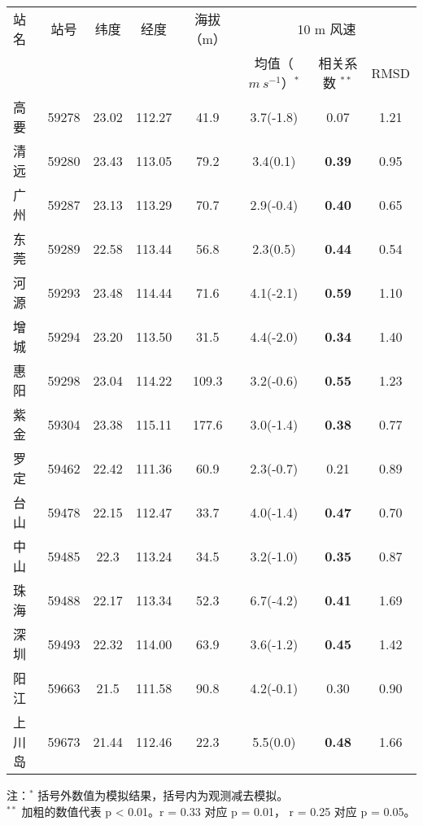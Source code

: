 \begin{table}[!htbp]
    \label{tab:PRDsiteinfo}
    \centering
    \small%
    \setlength{\tabcolsep}{5 pt}%
    \renewcommand{\arraystretch}{1.0}%
    \begin{tabular}{lccccccc}
        \hline
        站名 & 站号 & 纬度 & 经度 & 海拔（m）&  \multicolumn{3}{c}{10 m 风速} \\
         & & & & & 均值（$m ~ s^{-1}$）$^*$ &  相关系数 $^ {**}$ & RMSD \\
        \hline
        高要 & 59278 & 23.02 & 112.27 & 41.9 & 3.7(-1.8) & 0.07 & 1.21 \\
        清远 & 59280 & 23.43 & 113.05 & 79.2 & 3.4(0.1) & \textbf{0.39} & 0.95 \\
        广州 & 59287 & 23.13 & 113.29 & 70.7 & 2.9(-0.4) & \textbf{0.40} & 0.65 \\
        东莞 & 59289 & 22.58 & 113.44 & 56.8 & 2.3(0.5) & \textbf{0.44} & 0.54 \\
        河源 & 59293 & 23.48 & 114.44 & 71.6 & 4.1(-2.1) & \textbf{0.59} & 1.10 \\
        增城 & 59294 & 23.20 & 113.50 & 31.5 & 4.4(-2.0) & \textbf{0.34} & 1.40 \\
        惠阳 & 59298 & 23.04 & 114.22 & 109.3 & 3.2(-0.6) & \textbf{0.55} & 1.23 \\
	   紫金 & 59304 & 23.38 & 115.11 & 177.6 & 3.0(-1.4) & \textbf{0.38} & 0.77 \\
	   罗定 & 59462 & 22.42 & 111.36 & 60.9 & 2.3(-0.7) & 0.21 & 0.89 \\
	   台山 & 59478 & 22.15 & 112.47 & 33.7 & 4.0(-1.4) & \textbf{0.47} & 0.70 \\
	   中山 & 59485 & 22.3 & 113.24 & 34.5 & 3.2(-1.0) & \textbf{0.35} & 0.87 \\
	   珠海 & 59488 & 22.17 & 113.34 & 52.3 & 6.7(-4.2) & \textbf{0.41} & 1.69\\
	   深圳 & 59493 & 22.32 & 114.00 & 63.9 & 3.6(-1.2) & \textbf{0.45} & 1.42 \\
	   阳江 & 59663 & 21.5 & 111.58 & 90.8 & 4.2(-0.1) & 0.30 & 0.90 \\
	   上川岛 & 59673 & 21.44 & 112.46 & 22.3 & 5.5(0.0) & \textbf{0.48} & 1.66 \\    
        \hline
    \end{tabular}
     \vspace*{3ex}
    \begin{minipage}{0.9\textwidth}%
    注：$^*$ 括号外数值为模拟结果，括号内为观测减去模拟。\\ 
    $^{**}$ 加粗的数值代表 p < 0.01。r = 0.33 对应 p = 0.01， r = 0.25 对应 p = 0.05。
    \end{minipage}
\end{table}

